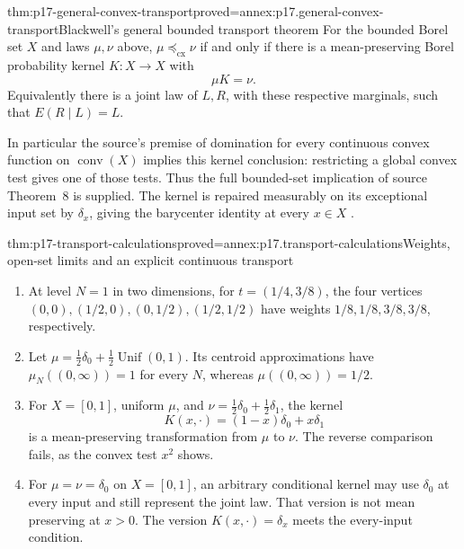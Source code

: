 \begin{hbtheorem}{thm:p17-general-convex-transport}{proved=annex:p17.general-convex-transport}{Blackwell's general bounded transport theorem}
For the bounded Borel set \(X\) and laws \(\mu,\nu\) above,
\(\mu\preceq_{\mathrm{cx}}\nu\) if and only if there is a
mean-preserving Borel probability kernel \(K:X\to X\) with
\[
                                  \mu K=\nu.
\]
Equivalently there is a joint law of \(L,R\), with these respective
marginals, such that \(E(R\mid L)=L\).

In particular the source's premise of domination for every continuous
convex function on \(\operatorname{conv}(X)\) implies this kernel
conclusion: restricting a global convex test gives one of those tests.
Thus the full bounded-set implication of source Theorem~8 is supplied.
The kernel is repaired measurably on its exceptional input set by
\(\delta_x\), giving the barycenter identity at every \(x\in X\)
\cite[pp.~268--269]{Blackwell1953EquivalentExperiments}.
\end{hbtheorem}

\begin{hbtheorem}{thm:p17-transport-calculations}{proved=annex:p17.transport-calculations}{Weights, open-set limits and an explicit continuous transport}
\begin{enumerate}
\item At level \(N=1\) in two dimensions, for
      \(t=(1/4,3/8)\), the four vertices
      \((0,0),(1/2,0),(0,1/2),(1/2,1/2)\) have weights
      \(1/8,1/8,3/8,3/8\), respectively.
\item Let \(\mu=\frac12\delta_0+\frac12\operatorname{Unif}(0,1)\).
      Its centroid approximations have
      \(\mu_N((0,\infty))=1\) for every \(N\), whereas
      \(\mu((0,\infty))=1/2\).
\item For \(X=[0,1]\), uniform \(\mu\), and
      \(\nu=\frac12\delta_0+\frac12\delta_1\), the kernel
      \[
                K(x,\cdot)=(1-x)\delta_0+x\delta_1
      \]
      is a mean-preserving transformation from \(\mu\) to \(\nu\).
      The reverse comparison fails, as the convex test \(x^2\) shows.
\item For \(\mu=\nu=\delta_0\) on \(X=[0,1]\), an arbitrary conditional
      kernel may use \(\delta_0\) at every input and still represent the
      joint law. That version is not mean preserving at \(x>0\).
      The version \(K(x,\cdot)=\delta_x\) meets the every-input condition.
\end{enumerate}
\end{hbtheorem}

